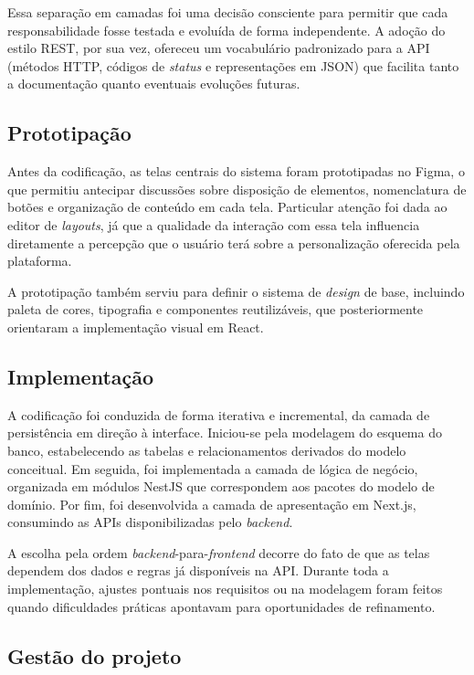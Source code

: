 Essa separação em camadas foi uma decisão consciente para permitir que cada responsabilidade fosse testada e evoluída de forma independente. A adoção do estilo REST, por sua vez, ofereceu um vocabulário padronizado para a API (métodos HTTP, códigos de \textit{status} e representações em JSON) que facilita tanto a documentação quanto eventuais evoluções futuras.

\subsection{Prototipação}

Antes da codificação, as telas centrais do sistema foram prototipadas no Figma, o que permitiu antecipar discussões sobre disposição de elementos, nomenclatura de botões e organização de conteúdo em cada tela. Particular atenção foi dada ao editor de \textit{layouts}, já que a qualidade da interação com essa tela influencia diretamente a percepção que o usuário terá sobre a personalização oferecida pela plataforma.

A prototipação também serviu para definir o sistema de \textit{design} de base, incluindo paleta de cores, tipografia e componentes reutilizáveis, que posteriormente orientaram a implementação visual em React.

\subsection{Implementação}

A codificação foi conduzida de forma iterativa e incremental, da camada de persistência em direção à interface. Iniciou-se pela modelagem do esquema do banco, estabelecendo as tabelas e relacionamentos derivados do modelo conceitual. Em seguida, foi implementada a camada de lógica de negócio, organizada em módulos NestJS que correspondem aos pacotes do modelo de domínio. Por fim, foi desenvolvida a camada de apresentação em Next.js, consumindo as APIs disponibilizadas pelo \textit{backend}.

A escolha pela ordem \textit{backend}-para-\textit{frontend} decorre do fato de que as telas dependem dos dados e regras já disponíveis na API. Durante toda a implementação, ajustes pontuais nos requisitos ou na modelagem foram feitos quando dificuldades práticas apontavam para oportunidades de refinamento.

\subsection{Gestão do projeto}

